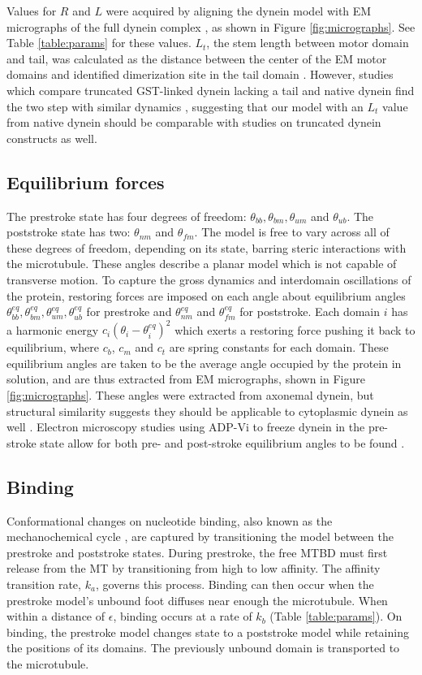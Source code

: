 \documentclass[9pt,twocolumn,twoside]{article}
\begin{document}
Values for $R$ and $L$ were acquired by aligning the dynein model with EM micrographs of the full dynein complex \cite{burgess-paper,grotjahn}, as shown in Figure \ref{fig:micrographs}. See Table \ref{table:params} for these values. $L_t$, the stem length between motor domain and tail, was calculated as the distance between the center of the EM motor domains and identified dimerization site in the tail domain \cite{}. However, studies which compare truncated GST-linked dynein lacking a tail and native dynein find the two step with similar dynamics \cite{weihongpaper-i-think}, suggesting that our model with an $L_t$ value from native dynein should be comparable with studies on truncated dynein constructs as well.

\subsection*{Equilibrium forces}
The prestroke state has four degrees of freedom: $\theta_{bb}, \theta_{bm}, \theta_{um}$ and $\theta_{ub}$. The poststroke state has two: $\theta_{nm}$ and $\theta_{fm}$. The model is free to vary across all of these degrees of freedom, depending on its state, barring steric interactions with the microtubule. These angles describe a planar model which is not capable of transverse motion. To capture the gross dynamics and interdomain oscillations of the protein, restoring forces are imposed on each angle about equilibrium angles $\theta^{eq}_{bb}, \theta^{eq}_{bm}, \theta^{eq}_{um}, \theta^{eq}_{ub}$ for prestroke and $\theta^{eq}_{nm}$ and $\theta^{eq}_{fm}$ for poststroke. Each domain $i$ has a harmonic energy $c_i\left(\theta_i-\theta^{eq}_i\right)^2$ which exerts a restoring force pushing it back to equilibrium, where $c_b$, $c_m$ and $c_t$ are spring constants for each domain. These equilibrium angles are taken to be the average angle occupied by the protein in solution, and are thus extracted from EM micrographs, shown in Figure \ref{fig:micrographs}. These angles were extracted from axonemal dynein, but structural similarity suggests they should be applicable to cytoplasmic dynein as well \cite{dynein-c-paper}. Electron microscopy studies using ADP-Vi to freeze dynein in the pre-stroke state allow for both pre- and post-stroke equilibrium angles to be found \cite{burgess-paper}.


\subsection*{Binding}
Conformational changes on nucleotide binding, also known as the mechanochemical cycle \cite{cianfrocco}, are captured by transitioning the model between the prestroke and poststroke states. During prestroke, the free MTBD must first release from the MT by transitioning from high to low affinity. The affinity transition rate, $k_a$, governs this process. Binding can then occur when the prestroke model's unbound foot diffuses near enough the microtubule. When within a distance of $\epsilon$, binding occurs at a rate of $k_b$ (Table \ref{table:params}). On binding, the prestroke model changes state to a poststroke model while retaining the positions of its domains. The previously unbound domain is transported to the microtubule.
\end{document}
